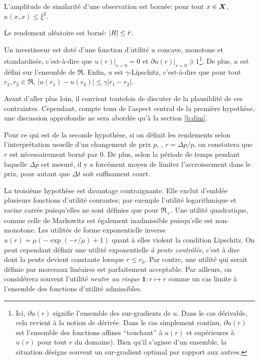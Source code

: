 \begin{assumption}
  L'amplitude de similarité d'une observation est bornée: pour tout $x \in \bm{X}$,
  $\kappa(x,x) \leq \xi^2$.
\end{assumption}
\begin{assumption}
  Le rendement aléatoire est borné: $|R| \leq \bar r$.
\end{assumption}
\begin{assumption}
  Un investisseur est doté d'une fonction d'utilité $u$ concave, monotone et standardisée,
  c'est-à-dire que $u(r)|_{r=0} = 0$ et $\partial u(r)|_{r=0} \ni 1$\footnote{Ici,
    $\partial u(r)$ signifie l'ensemble des sur-gradients de $u$. Dans le cas dérivable, cela
    revient à la notion de dérivée. Dans le cas simplement continu, $\partial u(r)$ est
    l'ensemble des fonctions affines ``touchant'' à $u(r)$ et supérieures à $u(r)$ pour
    tout $r$ du domaine). Bien qu'il s'agisse d'un ensemble, la situation désigne souvent
    un sur-gradient optimal par rapport aux autres.}. De plus, $u$ est défini sur
  l'ensemble de $\Re$. Enfin, $u$ est $\gamma$-Lipschitz, c'est-à-dire que pour tout
  $r_1,r_2 \in \Re$, $|u(r_1) - u(r_2)| \leq \gamma|r_1-r_2|$.
\end{assumption}

Avant d'aller plus loin, il convient toutefois de discuter de la plausiblité de ces
contraintes. Cependant, compte tenu de l'aspect central de la première hypothèse, une
discussion approfondie ne sera abordée qu'à la section \ref{b:dim}.

Pour ce qui est de la seconde hypothèse, si on définit les rendements selon
l'interprétation usuelle d'un changement de prix $p$, \ie, $r = \Delta p/p$, on constatera que
$r$ est nécessairement borné par 0. De plus, selon la période de temps pendant laquelle
$\Delta p$ est mesuré, il y a forcément moyen de limiter l'accroissement dans le prix, pour
autant que $\Delta t$ soit suffisament court.

La troisième hypothèse est davantage contraignante. Elle exclut d'emblée plusieurs
fonctions d'utilité courantes; par exemple l'utilité logarithmique et racine carrée
puisqu'elles ne sont définies que pour $\Re_{+}$. Une utilité quadratique, comme celle de
Markowitz est également inadmissible puisqu'elle est non-monotone. Les utilités de forme
exponentielle inverse $u(r) = \mu(-\exp(-r/\mu)+1)$ quant à elles violent la condition
Lipschitz. On peut cependant définir une utilité exponentielle \textit{à pente contrôlée},
c'est à dire dont la pente devient constante lorsque $r \leq r_0$. Par contre, une utilité
qui serait définie par morceaux linéaires est parfaitement acceptable. Par ailleurs, on
considérera souvent l'utilité \textit{neutre au risque} $\bm{1}: r \mapsto r$ comme un cas
limite à l'ensemble des fonctions d'utilité admissibles.


